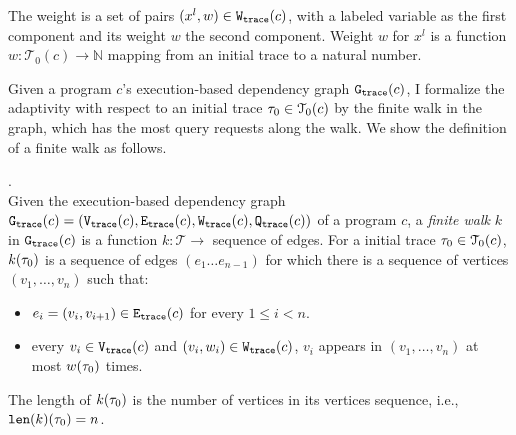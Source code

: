 The weight is a set of pairs $(x^l, w) \in \mathtt{{W_{trace}}}(c)$,
with a labeled variable as the first component and
its weight $w$ the second component.
Weight $w$ for
$x^l$ is a function $w : \mathcal{T}_0(c) \to \mathbb{N}$
mapping from an initial trace to a natural number.

Given 
a program $c$'s execution-based dependency graph 
$\mathtt{{G_{trace}}}({c})$,
I formalize the adaptivity 
with respect to an initial trace $\mathtt{\tau}_0 \in \mathcal{T}_0(c)$ by the finite walk in the graph, which has the most query requests along the walk.
We show the definition of a finite walk as follows.
%


\begin{defn}.
 \label{def:finitewalk}
 \\
 Given the execution-based dependency graph $\mathtt{{G_{trace}}}({c}) = (\mathtt{{V_{trace}}}({c}), \mathtt{{E_{trace}}}({c}), \mathtt{{W_{trace}}}({c}), \mathtt{{Q_{trace}}}({c}))$ of a program $c$,
 a \emph{finite walk} $k$ in $\mathtt{{G_{trace}}}({c})$ is a 
 function $k: \mathcal{T} \to $ sequence of edges.
 For a initial trace $\mathtt{\tau}_0 \in \mathcal{T}_0(c)$, 
 $k(\mathtt{\tau}_0)$ is a sequence of edges $(e_1 \ldots e_{n - 1})$ 
 for which there is a sequence of vertices 
 $(v_1, \ldots, v_{n})$ such that:
 \begin{itemize}
 \item $e_i = (v_{i},v_{i + 1}) \in \mathtt{{E_{trace}}}(c)$ for every $1 \leq i < n$.
 \item every $v_i \in \mathtt{{V_{trace}}}(c)$
 and $(v_i, w_i) \in \mathtt{{W_{trace}}}(c)$, 
 $v_i$ appears in $(v_1, \ldots, v_{n})$ at most 
 $w(\mathtt{\tau}_0)$
 times. 
 \end{itemize}
 The length of $k(\mathtt{\tau}_0)$ is the number of vertices in its vertices sequence, i.e., $\mathtt{len}(k)(\mathtt{\tau}_0) = n$.
 \end{defn}

